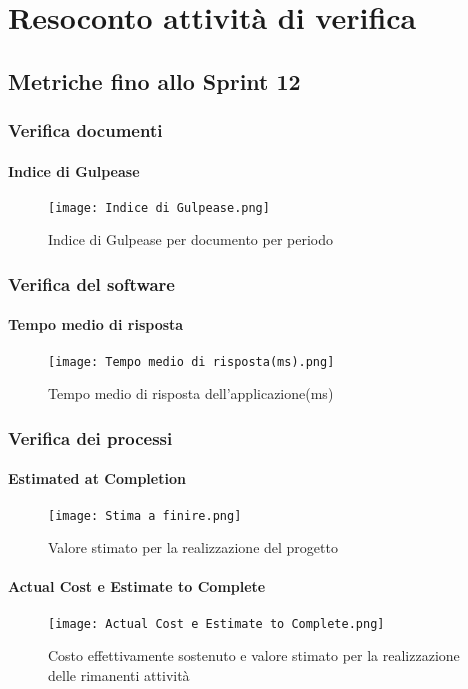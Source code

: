 \chapter{Resoconto attività di verifica}

\section{Metriche fino allo Sprint 12}

  \subsection{Verifica documenti}
    \subsubsection{Indice di Gulpease}
    \begin{figure}[H]
      \centering
      \texttt{[image: Indice di Gulpease.png]}
      \caption{Indice di Gulpease per documento per periodo}
    \end{figure}

  \subsection{Verifica del software}
    \subsubsection{Tempo medio di risposta}
    \begin{figure}[H]
      \centering
      \texttt{[image: Tempo medio di risposta(ms).png]}
      \caption{Tempo medio di risposta dell'applicazione(ms)}
    \end{figure}


  \subsection{Verifica dei processi}
    \subsubsection{Estimated at Completion}
    \begin{figure}[H]
      \centering
      \texttt{[image: Stima a finire.png]}
      \caption{Valore stimato per la realizzazione del progetto}
    \end{figure}

    \subsubsection{Actual Cost e Estimate to Complete}
    \begin{figure}[H]
      \centering
      \texttt{[image: Actual Cost e Estimate to Complete.png]}
      \caption{Costo effettivamente sostenuto e valore stimato per la realizzazione delle rimanenti attività}
    \end{figure}

